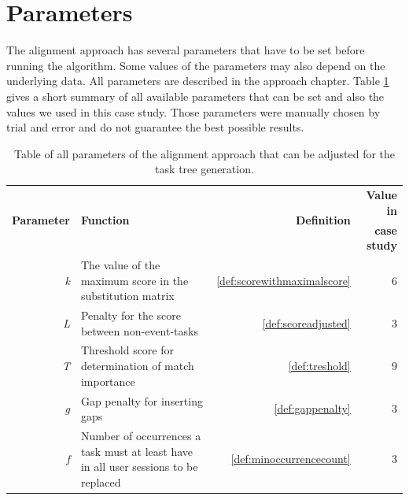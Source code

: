 \section{Parameters}
The alignment approach has several parameters that have to be set before running the algorithm. Some values of the parameters may also depend on the underlying data.
All parameters are described in the approach chapter. Table \ref{tab:parameters} gives a short summary of all available parameters that can be set and also the values
we used in this case study. Those parameters were manually chosen by trial and error and do not guarantee the best possible results.

\begin{table}
	\begin{tabularx}{\textwidth}{ r X r r}
	   \toprule
		\multirow{2}{*}{\textbf{Parameter}} & \multirow{2}{*}{\textbf{Function}} & \multirow{2}{*}{\textbf{Definition}} & \textbf{Value in} \\
		& & &\textbf{case study}\\
	     \midrule
	       \emph{k} & The value of the maximum score in the substitution matrix& \ref{def:scorewithmaximalscore}& 6  \\
			 \noalign{\medskip}
	       \emph{L} & Penalty for the score between non-event-tasks & \ref{def:scoreadjusted} & 3 \\
	      \noalign{\medskip}
			 \emph{T} & Threshold score for determination of match importance & \ref{def:treshold} & 9\\
	      \noalign{\medskip}
			\emph{g} & Gap penalty for inserting gaps & \ref{def:gappenalty} & 3 \\
	      \noalign{\medskip}
			 \emph{f} & Number of occurrences a task must at least have in all user sessions to be replaced & \ref{def:minoccurrencecount} &3\\
	       \bottomrule
 \end{tabularx}
 \caption{Table of all parameters of the alignment approach that can be adjusted for the task tree generation.}
 \label{tab:parameters}
 \end{table}


